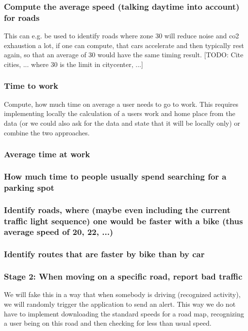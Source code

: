 \subsubsection{Compute the average speed (talking daytime into account) for roads}
This can e.g. be used to identify roads where zone 30 will reduce noise and co2 exhaustion a lot, if one can compute, that cars accelerate and then typically rest again, so that an average of 30 would have the same timing result. [TODO: Cite cities, ... where 30 is the limit in citycenter, ...]
\subsubsection{Time to work}
Compute, how much time on average a user needs to go to work.
This requires implementing locally the calculation of a users work and home place from the data (or we could also ask for the data and state that it will be locally only) or combine the two approaches.
\subsubsection{Average time at work}
\subsubsection{How much time to people usually spend searching for a parking spot}
\subsubsection{Identify roads, where (maybe even including the current traffic light sequence) one would be faster with a bike (thus average speed of 20, 22, ...)}
\subsubsection{Identify routes that are faster by bike than by car}



\subsubsection{Stage 2: When moving on a specific road, report bad traffic}
We will fake this in a way that when somebody is driving (recognized activity), we will randomly trigger the application to send an alert.
This way we do not have to implement downloading the standard speeds for a road map, recognizing a user being on this road and then checking for less than usual speed.

